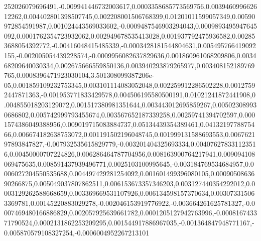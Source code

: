 252026079696491,-0.009941446732003617,0.0003358685773569756,0.003946099662612262,0.004402801398507745,0.002208001506768399,0.01201011599057349,0.00590972854591987,0.001024443569033602,-0.0009487546903294043,0.0009893495947645092,0.0001762354723932062,0.002949678535413028,0.001937792475936582,0.002853688054392772,-0.00416048415485339,-0.0003428181544804631,0.005495766419092155,-0.002005054439228574,-0.0009956082637829636,0.001860961068209806,0.003468209640030334,0.002675666559850136,0.003940293879265977,0.003408152189769765,0.0008396471923030104,3.501308099387206e-05,0.001859109232753345,0.003101114083052048,0.002259912286502228,0.00127592447871363,-0.001953771833429578,0.004506195580500191,0.01021241872441908,0.004855018203129072,0.001517380981351644,0.003443012695859267,0.005023089930686802,0.005742999793455674,0.003567652187339258,0.00259741394702597,0.0001574386049388956,0.009019715083884737,0.05134439354389461,0.0413219778875466,0.006674182638753072,0.001191502196048745,0.001999131588693553,0.006762197893847827,-0.007932535615829779,-0.003201404325693334,0.004076278331123516,0.00450000707224826,0.006286464787704956,0.008163900764217941,0.009094108069475635,0.008591437939496771,0.0025103100995645,-0.003184769534684957,0.0006027204550535688,0.004497429281254092,0.001601499396080105,0.0009050863690266875,0.005049037807862511,0.006153673357346203,0.003127440354292012,0.0003129262588668659,0.003369669531107926,0.006134598157370634,0.003073315063369781,0.00145220883029278,-0.002046153919776922,-0.003664261625781327,-0.0007469480166886829,0.002057925639661782,0.0001205127942763996,-0.000816743371790524,0.0002131862253209295,0.001544917886967035,-0.001364847948771167,-0.005870579108327254,-0.0006004952267213101
